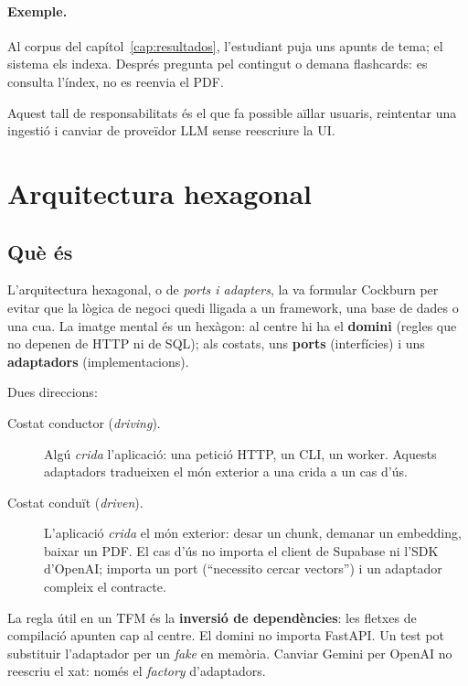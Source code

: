 \paragraph{Exemple.}
Al corpus del capítol~\ref{cap:resultados}, l'estudiant puja uns apunts de tema; el sistema els indexa. Després pregunta pel contingut o demana flashcards: es consulta l'índex, no es reenvia el PDF.

Aquest tall de responsabilitats és el que fa possible aïllar usuaris, reintentar una ingestió i canviar de proveïdor LLM sense reescriure la UI.

\section{Arquitectura hexagonal}
\label{sec:hex}

\subsection{Què és}

L'arquitectura hexagonal, o de \emph{ports i adapters}, la va formular Cockburn \parencite{cockburn2005hexagonal} per evitar que la lògica de negoci quedi lligada a un framework, una base de dades o una cua. La imatge mental és un hexàgon: al centre hi ha el \textbf{domini} (regles que no depenen de HTTP ni de SQL); als costats, uns \textbf{ports} (interfícies) i uns \textbf{adaptadors} (implementacions).

Dues direccions:

\begin{description}
  \item[Costat conductor (\emph{driving}).] Algú \emph{crida} l'aplicació: una petició HTTP, un CLI, un worker. Aquests adaptadors tradueixen el món exterior a una crida a un cas d'ús.
  \item[Costat conduït (\emph{driven}).] L'aplicació \emph{crida} el món exterior: desar un chunk, demanar un embedding, baixar un PDF. El cas d'ús no importa el client de Supabase ni l'SDK d'OpenAI; importa un port (``necessito cercar vectors'') i un adaptador compleix el contracte.
\end{description}

La regla útil en un TFM és la \textbf{inversió de dependències}: les fletxes de compilació apunten cap al centre. El domini no importa FastAPI. Un test pot substituir l'adaptador per un \emph{fake} en memòria. Canviar Gemini per OpenAI no reescriu el xat: només el \emph{factory} d'adaptadors.

